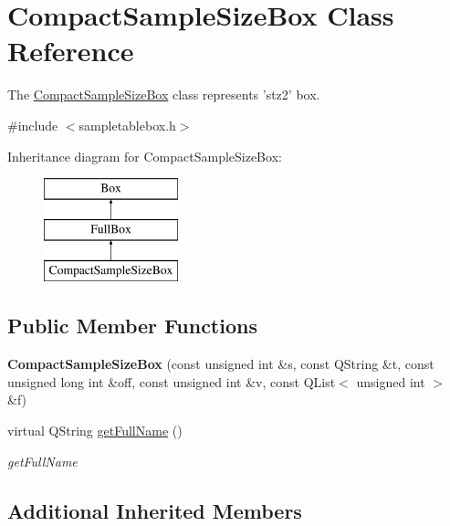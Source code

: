 \hypertarget{class_compact_sample_size_box}{\section{Compact\-Sample\-Size\-Box Class Reference}
\label{class_compact_sample_size_box}
}


The \hyperlink{class_compact_sample_size_box}{Compact\-Sample\-Size\-Box} class represents 'stz2' box.  




{\ttfamily \#include $<$sampletablebox.\-h$>$}

Inheritance diagram for Compact\-Sample\-Size\-Box\-:\begin{figure}[H]
\begin{center}
\leavevmode
\includegraphics[height=3.000000cm]{class_compact_sample_size_box}
\end{center}
\end{figure}
\subsection*{Public Member Functions}
\begin{DoxyCompactItemize}
\item 
\hypertarget{class_compact_sample_size_box_aadd7045acff4abdf1562c9de33dcfba0}{{\bfseries Compact\-Sample\-Size\-Box} (const unsigned int \&s, const Q\-String \&t, const unsigned long int \&off, const unsigned int \&v, const Q\-List$<$ unsigned int $>$ \&f)}\label{class_compact_sample_size_box_aadd7045acff4abdf1562c9de33dcfba0}

\item 
virtual Q\-String \hyperlink{class_compact_sample_size_box_a10c8ab4b452dd5c2d58e2c744ffac884}{get\-Full\-Name} ()
\begin{DoxyCompactList}\small\item\em get\-Full\-Name \end{DoxyCompactList}\end{DoxyCompactItemize}
\subsection*{Additional Inherited Members}


